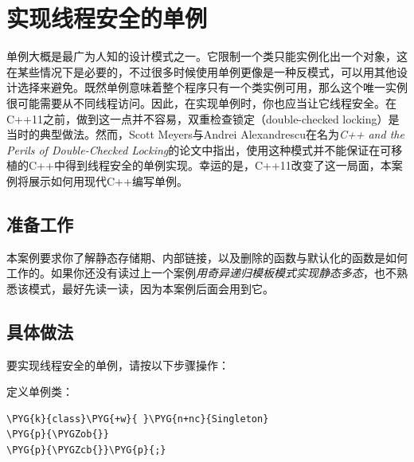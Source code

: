 
\section{实现线程安全的单例}



单例大概是最广为人知的设计模式之一。它限制一个类只能实例化出一个对象，这在某些情况下是必要的，不过很多时候使用单例更像是一种反模式，可以用其他设计选择来避免。既然单例意味着整个程序只有一个类实例可用，那么这个唯一实例很可能需要从不同线程访问。因此，在实现单例时，你也应当让它线程安全。在C++11之前，做到这一点并不容易，双重检查锁定（double-checked locking）是当时的典型做法。然而，Scott Meyers与Andrei Alexandrescu在名为\textit{C++ and the Perils of Double-Checked Locking}的论文中指出，使用这种模式并不能保证在可移植的C++中得到线程安全的单例实现。幸运的是，C++11改变了这一局面，本案例将展示如何用现代C++编写单例。



\subsection{准备工作}



本案例要求你了解静态存储期、内部链接，以及删除的函数与默认化的函数是如何工作的。如果你还没有读过上一个案例\textit{用奇异递归模板模式实现静态多态}，也不熟悉该模式，最好先读一读，因为本案例后面会用到它。



\subsection{具体做法}



要实现线程安全的单例，请按以下步骤操作：



定义单例类：



\begin{codeblockbg}
\begin{Verbatim}[commandchars=\\\{\},breaklines=true,breakanywhere=true,fontsize=\codefont,xleftmargin=17bp]
\PYG{k}{class}\PYG{+w}{ }\PYG{n+nc}{Singleton}
\PYG{p}{\PYGZob{}}
\PYG{p}{\PYGZcb{}}\PYG{p}{;}
\end{Verbatim}
\end{codeblockbg}


